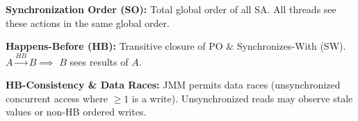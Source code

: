 \begin{definition}
    \textbf{Synchronization Order (SO):} Total global order of all SA. All threads see these actions in the same global order.
\end{definition}

\begin{definition}
    \textbf{Happens-Before (HB):} Transitive closure of PO \& Synchronizes-With (SW). $A \xrightarrow{HB} B \implies$ $B$ sees results of $A$.
\end{definition}

\begin{remark}
    \textbf{HB-Consistency \& Data Races:} JMM permits data races (unsynchronized concurrent access where $\ge 1$ is a write). Unsynchronized reads may observe stale values or non-HB ordered writes.
\end{remark}
